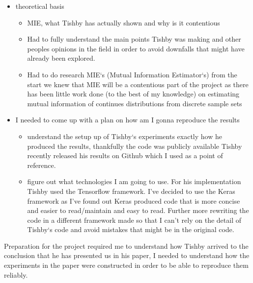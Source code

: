 
\begin{itemize}
  \item{
      theoretical basis 
      \begin{itemize}
        \item{
            MIE, what Tishby has actually shown and why is it contentious
          }
        \item{
            Had to fully understand the main points Tishby was making and other
            peoples opinions in the field in order to avoid downfalls that might
            have already been explored.
          
          }
        \item{
            Had to do research MIE`s (Mutual Information Estimator`s) from the
            start we knew that MIE will be a contentious part of the project as
            there has been little work done (to the best of my knowledge) on
            estimating mutual information of continues distributions from
            discrete sample sets
          }
      \end{itemize}
    }
  \item{
      I needed to come up with a plan on how am I gonna reproduce the results
      \begin{itemize}
        \item{
            understand the setup up of Tishby`s experiments exactly how he
            produced the results, thankfully the code was publicly available
            Tishby recently released his results on Github which I used as a
            point of reference.
          }
        \item{
            figure out what technologies I am going to use. For his
            implementation Tishby used the Tensorflow framework. I've decided to
            use the Keras framework as I've found out Keras produced code that
            is more concise and easier to read/maintain and easy to read.
            Further more rewriting the code in a different framework made so
            that I can't rely on the detail of Tishby`s code and avoid mistakes
            that might be in the original code.
          }
      \end{itemize}
      
    }
\end{itemize}

Preparation for the project required me to understand how Tishby arrived to the
conclusion that he has presented us in his paper, I needed to understand how the
experiments in the paper were constructed in order to be able to reproduce them reliably.

